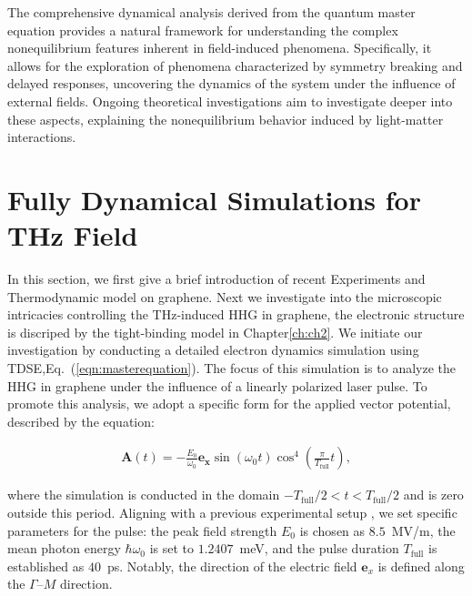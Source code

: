 The comprehensive dynamical analysis derived from the quantum master equation provides a natural framework for understanding the complex nonequilibrium features inherent in field-induced phenomena. Specifically, it allows for the exploration of phenomena characterized by symmetry breaking and delayed responses, uncovering the dynamics of the system under the influence of external fields. Ongoing theoretical investigations aim to investigate deeper into these aspects, explaining the nonequilibrium behavior induced by light-matter interactions.
\section{Fully Dynamical Simulations for THz Field}

In this section, we first give a brief introduction of recent Experiments and Thermodynamic model on
graphene. Next we investigate into the microscopic intricacies controlling the THz-induced \gls{HHG} in graphene, the electronic structure is discriped by the tight-binding
model in Chapter\ref{ch:ch2}.
We initiate our investigation by conducting a detailed electron dynamics simulation using \gls{TDSE},Eq.~(\ref{eqn:masterequation}). The focus of this simulation is to analyze the \gls{HHG} in graphene under the influence of a linearly polarized laser pulse. To promote this analysis, we adopt a specific form for the applied vector potential, described by the equation:

\begin{align}
	\mathbf A(t) = -\frac{E_0}{\omega_0}\mathbf{e_x} \sin(\omega_0 t)\cos^4 \left (\frac{\pi}{T_\mathrm{full}} t \right),
	\label{eqn:laser_pulse}
\end{align}

where the simulation is conducted in the domain $-T_\mathrm{full}/2 < t < T_\mathrm{full}/2$ and is zero outside this period. Aligning with a previous experimental setup \cite{hafez2018extremely}, we set specific parameters for the pulse: the peak field strength $E_0$ is chosen as $8.5$~MV/m, the mean photon energy $\hbar \omega_0$ is set to $1.2407$~meV, and the pulse duration $T_{\mathrm{full}}$ is established as $40$~ps. Notably, the direction of the electric field $\mathbf e_x$ is defined along the $\Gamma$--$M$ direction.

